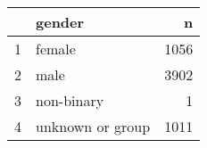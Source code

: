 \begin{table}[ht]
\centering
\begin{tabular}{rlr}
  \hline
 & gender & n \\ 
  \hline
1 & female & 1056 \\ 
  2 & male & 3902 \\ 
  3 & non-binary &   1 \\ 
  4 & unknown or group & 1011 \\ 
   \hline
\end{tabular}
\end{table}

